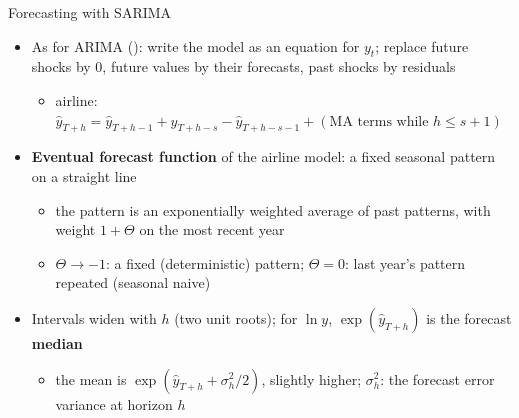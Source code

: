 \begin{frame}{Forecasting with SARIMA}
\itemsize{\small}
\begin{itemize}
    \item As for ARIMA (): write the model as an equation for $y_t$; replace future shocks by 0, future values by their forecasts, past shocks by residuals
    \begin{itemize}
        \item airline: $\hat y_{T+h} = \hat y_{T+h-1} + \hat y_{T+h-s} - \hat y_{T+h-s-1} + (\text{MA terms while } h \le s + 1)$
    \end{itemize}
    \item \textbf{Eventual forecast function} of the airline model: a fixed seasonal pattern on a straight line
    \begin{itemize}
        \item the pattern is an exponentially weighted average of past patterns, with weight $1 + \Theta$ on the most recent year
        \item $\Theta \to -1$: a fixed (deterministic) pattern; $\Theta = 0$: last year's pattern repeated (seasonal naive)
    \end{itemize}
    \item Intervals widen with $h$ (two unit roots); for $\ln y$, $\exp(\hat y_{T+h})$ is the forecast \textbf{median}
    \begin{itemize}
        \item the mean is $\exp(\hat y_{T+h} + \sigma_h^2/2)$, slightly higher; $\sigma_h^2$: the forecast error variance at horizon $h$
    \end{itemize}
\end{itemize}
\end{frame}

